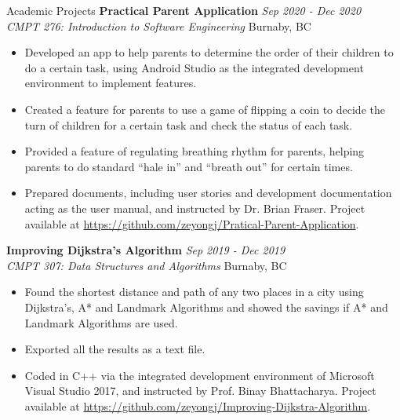 \documentclass{resume} %
\begin{document}
\begin{rSection}{Academic Projects}
{\bf Practical Parent Application} \hfill {\em Sep 2020 - Dec 2020} 
\\{\textit{CMPT 276: Introduction to Software Engineering} \hfill {Burnaby, BC}}
\begin{itemize}
    \vspace{-0.2cm}\item Developed an app to help parents to determine the order of their children to do a certain task, using Android Studio as the integrated development environment to implement features. 
    \vspace{-0.2cm}\item Created a feature for parents to use a game of flipping a coin to decide the turn of children for a certain task and check the status of each task.
    \vspace{-0.2cm}\item Provided a feature of regulating breathing rhythm for parents, helping parents to do standard ``hale in” and ``breath out” for certain times. 
    \vspace{-0.2cm}\item Prepared documents, including user stories and development documentation acting as the user manual, and instructed by Dr. Brian Fraser. Project available at \url{https://github.com/zeyongj/Pratical-Parent-Application}.
\end{itemize}

{\bf Improving Dijkstra's Algorithm} \hfill {\em Sep 2019 - Dec 2019}
\\{\textit{CMPT 307: Data Structures and Algorithms} \hfill {Burnaby, BC}}
\begin{itemize}
    \vspace{-0.2cm}\item Found the shortest distance and path of any two places in a city using Dijkstra’s, A* and Landmark Algorithms and showed the savings if A* and Landmark Algorithms are used.
    \vspace{-0.2cm}\item Exported all the results as a text file.
    \vspace{-0.2cm}\item Coded in C++ via the integrated development environment of Microsoft Visual Studio 2017, and instructed by Prof. Binay Bhattacharya. Project available at \url{https://github.com/zeyongj/Improving-Dijkstra-Algorithm}.
\end{itemize}

\end{rSection}
\end{document}
